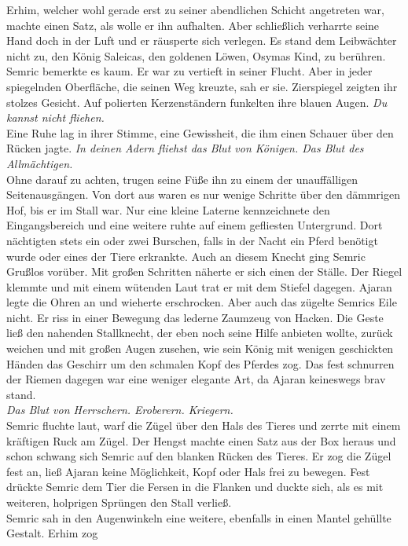Erhim, welcher wohl gerade erst zu seiner abendlichen Schicht angetreten war, machte einen Satz, 
als wolle er ihn aufhalten. Aber schließlich verharrte seine Hand doch in der Luft und er räusperte 
sich verlegen. Es stand dem Leibwächter nicht zu, den König Saleicas, den goldenen Löwen, Osymas 
Kind, zu berühren. Semric bemerkte es kaum. Er war zu vertieft in seiner Flucht. Aber in jeder 
spiegelnden Oberfläche, die seinen Weg kreuzte, sah er sie. Zierspiegel zeigten ihr stolzes Gesicht. 
Auf polierten Kerzenständern funkelten ihre blauen Augen. \textit{Du kannst nicht fliehen.}\\ 
Eine Ruhe lag in ihrer Stimme, eine Gewissheit, die ihm einen Schauer über den Rücken jagte. 
\textit{In deinen Adern fliehst das Blut von Königen. Das Blut des Allmächtigen.}\\
Ohne darauf zu achten, trugen seine Füße ihn zu einem der unauffälligen Seitenausgängen. Von dort 
aus waren es nur wenige Schritte über den dämmrigen Hof, bis er im Stall war. Nur eine kleine 
Laterne kennzeichnete den Eingangsbereich und eine weitere ruhte auf einem gefliesten Untergrund. 
Dort nächtigten stets ein oder zwei Burschen, falls in der Nacht ein Pferd benötigt wurde oder 
eines der Tiere erkrankte. Auch an diesem Knecht ging Semric Grußlos vorüber. Mit großen Schritten 
näherte er sich einen der Ställe. Der Riegel klemmte und mit einem wütenden Laut trat er mit 
dem Stiefel dagegen. Ajaran legte die Ohren an und wieherte erschrocken. Aber auch das zügelte 
Semrics Eile nicht. Er riss in einer Bewegung das lederne Zaumzeug von Hacken. Die Geste ließ den 
nahenden Stallknecht, der eben noch seine Hilfe anbieten wollte, zurück weichen und mit großen Augen 
zusehen, wie sein König mit wenigen geschickten Händen das Geschirr um den schmalen Kopf des Pferdes 
zog. Das fest schnurren der Riemen dagegen war eine weniger elegante Art, da Ajaran keineswegs brav 
stand. \\
\textit{Das Blut von Herrschern. Eroberern. Kriegern.}\\
Semric fluchte laut, warf die Zügel über den Hals des Tieres und zerrte mit einem kräftigen Ruck am 
Zügel. Der Hengst machte einen Satz aus der Box heraus und schon schwang sich Semric auf den blanken 
Rücken des Tieres. Er zog die Zügel fest an, ließ Ajaran keine Möglichkeit, Kopf oder Hals frei zu 
bewegen. Fest drückte Semric dem Tier die Fersen in die Flanken und duckte sich, als es mit 
weiteren, holprigen Sprüngen den Stall verließ.\\
Semric sah in den Augenwinkeln eine weitere, ebenfalls in einen Mantel gehüllte Gestalt. Erhim zog 
